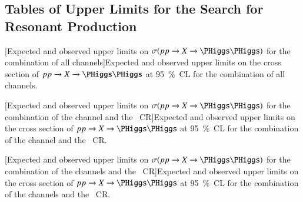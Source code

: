 \subsection{Tables of Upper Limits for the Search for Resonant \HH Production}%
\label{app:limit_tables}

{
  \centering

  \vspace*{17.5ex}

  [Expected and observed upper limits on
  $\sigma(\pp \to X \to \HH)$ for the combination of all channels]{Expected and
    observed upper limits on the cross section of $\pp \to X \to \HH$ at
    \SI{95}{\percent}~CL for the combination of all channels.}%
  \label{tab:comb_limits_resonant}

  
}

\clearpage

{
  \centering

  \null\vfill

  [Expected and observed upper limits on
  $\sigma(\pp \to X \to \HH)$ for the combination of the \hadhad channel and
  the \ZHF~CR]{Expected and observed upper limits on the cross section of
    $\pp \to X \to \HH$ at \SI{95}{\percent}~CL for the combination of the \hadhad
    channel and the \ZHF~CR.}%
  \label{tab:hadhad_limits_resonant}

  

  \null\vfill
}

\clearpage

{
  \centering

  \null\vfill

  [Expected and observed upper limits on
  $\sigma(\pp \to X \to \HH)$ for the combination of the \lephad channels and
  the \ZHF~CR]{Expected and observed upper limits on the cross section of
    $\pp \to X \to \HH$ at \SI{95}{\percent}~CL for the combination of the
    \lephad channels and the \ZHF~CR.}%
  \label{tab:lephad_limits_resonant}

  

  \null\vfill
}


\clearpage
